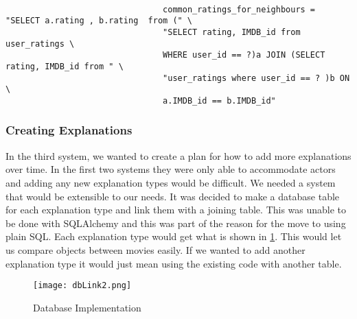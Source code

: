                         \begin{minipage}{\linewidth}
                            \begin{lstlisting}[gobble=30, tabsize=4, caption=SQL used to find neighbours ratings. ,label=fig:FindingNeighboursPearsonMethodSQL]

                                common_ratings_for_neighbours = "SELECT a.rating , b.rating  from (" \
                                "SELECT rating, IMDB_id from user_ratings \
                                WHERE user_id == ?)a JOIN (SELECT rating, IMDB_id from " \
                                "user_ratings where user_id == ? )b ON \
                                a.IMDB_id == b.IMDB_id"
                            \end{lstlisting}
                        \end{minipage}
                        


                \subsubsection{Creating Explanations}                

                    In the third system, we wanted to create a plan for how to add more explanations over time. In the first two systems they were only able to accommodate actors and adding any new explanation types would be difficult. We needed a system that would be extensible to our needs. It was decided to make a database table for each explanation type and link them with a joining table. This was unable to be done with SQLAlchemy and this was part of the reason for the move to using plain SQL. Each explanation type would get what is shown in \ref{fig:dbLink2}. This would let us compare objects between movies easily. If we wanted to add another explanation type it would just mean using the existing code with another table. 
                    
                
                    \begin{figure}[H]
                        \begin{center}
                        \texttt{[image: dbLink2.png]}
                        \end{center}
                        \caption{Database Implementation}
                        \label{fig:dbLink2}
                    \end{figure}
                    

